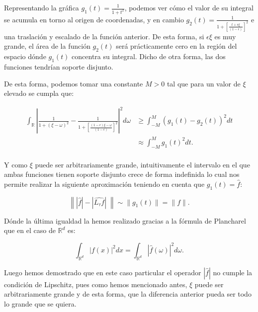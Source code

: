 \begin{observacion}
  \noindent Representando la gráfica $g_1(t)= \frac{1}{1+t^2}$, podemos ver cómo el valor de su integral se acumula en torno al origen de coordenadas, y en cambio $g_2(t)=\frac{1}{1+\left[ \frac{t+\epsilon\xi}{(1-\epsilon)}\right]^2}$ e una traslación y escalado de la función anterior. De esta forma, si $\epsilon\xi$ es muy grande, el área de la función $g_2(t)$ será prácticamente cero en la región del espacio dónde $g_1(t)$ concentra su integral. Dicho de otra forma, las dos funciones tendrían soporte disjunto.

  \noindent De esta forma, podemos tomar una constante $M>0$ tal que para un valor de $\xi$ elevado se cumpla que: 

  \begin{align*}
    \int_{\mathbb{R}} \left| \frac{1}{1+(\xi - \omega)^2} - \frac{1}{1+\left[ \frac{(1-\epsilon) \xi - \omega}{(1-\epsilon)}\right]^2} \right|^2 d\omega 
    &\geq \int_{-M}^{M} (g_1(t)-g_2(t))^2 dt \\
    &\approx \int_{-M}^{M} g_1(t)^2 dt. \\
  \end{align*}

  \noindent Y como $\xi$ puede ser arbitrariamente grande, intuitivamente el intervalo en el que ambas funciones tienen soporte disjunto crece de forma indefinida lo cual nos permite realizar la siguiente aproximación teniendo en cuenta que $g_1(t)=\widehat{f}$:

  \begin{equation} \label{eq::1.1}
    \left\| |\widehat{f}| -|\widehat{L_\tau f}| \; \right\| \sim \|g_1(t) \|=\|f\|. 
  \end{equation}

  \noindent Dónde la última igualdad la hemos realizado gracias a la fórmula de Plancharel que en el caso de $\mathbb{R}^d$ es: 

  \begin{equation} \label{eq::Plancharel}
    \int_{\mathbb{R}^d} \left|f(x)\right|^2 dx= \int_{\mathbb{R}^d}\left|\widehat{f}(\omega)\right|^2 d\omega.
  \end{equation}

  \noindent Luego hemos demostrado que en este caso particular el operador $|\widehat{f}|$ no cumple la condición de Lipschitz, pues como hemos mencionado antes, $\xi$ puede ser arbitrariamente grande y de esta forma, que la diferencia anterior pueda ser todo lo grande que se quiera.


\end{observacion}
